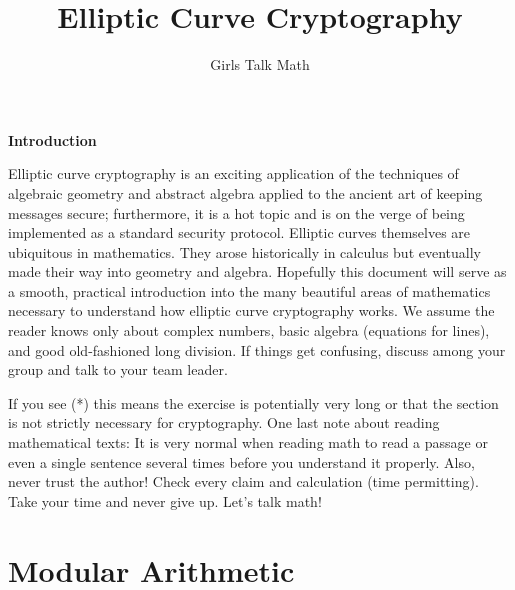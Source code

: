 \documentclass[12 pt]{article}
\title{Elliptic Curve Cryptography}
\author{Girls Talk Math}
\date{}
\newcounter{exercise}[section]
\begin{document}
\maketitle
\vskip 1in
\begin{center} \textbf{Introduction} \end{center}

Elliptic curve cryptography is an exciting application of the techniques of algebraic geometry and abstract algebra applied to the ancient art of keeping messages secure; furthermore, it is a hot topic and is on the verge of being implemented as a standard security protocol. Elliptic curves themselves are ubiquitous in mathematics. They arose historically in calculus but eventually made their way into geometry and algebra. Hopefully this document will serve as a smooth, practical introduction into the many beautiful areas of mathematics necessary to understand how elliptic curve cryptography works. We assume the reader knows only about complex numbers, basic algebra (equations for lines), and good old-fashioned long division. If things get confusing, discuss among your group and talk to your team leader.

\bigskip
If you see (*) this means the exercise is potentially very long or that the section is not strictly necessary for cryptography.
\smallskip
One last note about reading mathematical texts: It is very normal when reading math to read a passage or even a single sentence several times before you understand it properly. Also, never trust the author! Check every claim and calculation (time permitting). Take your time and never give up. Let's talk math!
\newpage

\tableofcontents



\newpage



\section{Modular Arithmetic}
\end{document}
